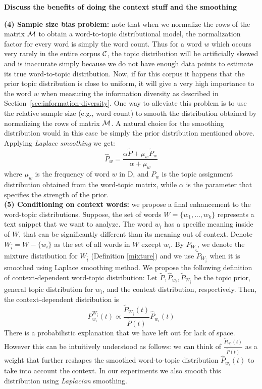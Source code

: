 {\bf Discuss the benefits of doing the context stuff and the smoothing}

{\bf (4) Sample size bias problem:}  note that 
when we normalize the rows of the matrix ${\mathcal M}$ to obtain a word-to-topic distributional model, the normalization factor 
for every word is simply the word count. Thus for a word $w$ which occurs very rarely
in the entire corpus ${\mathcal C}$, the topic distribution will be artificially skewed and is inaccurate simply because we do not have enough data points to estimate its true word-to-topic distribution.
Now, if for this corpus it happens that the prior topic distribution
is close to uniform, it will give a very high importance to the word
$w$ when measuring the information diversity as described in
Section~\ref{sec:information-diversity}.
One way to alleviate this
problem is to use the relative sample size (e.g., word count) to
smooth the distribution obtained by normalizing the rows of matrix
${\mathcal M}$. A natural choice for the smoothing distribution would in this
case be simply the prior distribution mentioned above. Applying {\em Laplace smoothing}
we get:
\begin{equation}
\widehat{P}_w=\frac{\alpha \tilde{P}+ \mu_w \tilde{P}_w}{\alpha+\mu_w}
\end{equation}
where $\mu_w$ is the frequency of word $w$ in D, and $P_w$ is the
topic assignment distribution obtained from the word-topic matrix,
while $\alpha$ is the parameter that specifies the strength of the
prior.\\
{\bf (5) Conditioning on context words:} we propose a final enhancement to the word-topic
distributions. Suppose, the set of words $W=\{w_1,...,w_k\}$
represents a text snippet that we want to analyze. The word $w_i$ has
a specific meaning inside of $W$, that can be significantly different
than its meaning out of context. Denote
$W_{\bar{i}}=W-\{w_i\}$ as the set of all words in $W$ except
$w_i$. By $P_{W_{\bar{i}}}$, we denote the mixture distribution for $W_{\bar{i}}$ (Definition \ref{mixture}) and we use $\tilde{P}_{W_{\bar{i}}}$ when it is smoothed using Laplace smoothing method. We
propose the following definition of context-dependent word-topic
distribution:
\bed
Let $\tilde{P},\widehat{P}_{w_i}, \tilde{P}_{W_{\bar{i}}}$ be the topic prior, general
topic distribution for $w_i$, and the context distribution,
respectively. Then, the context-dependent distribution is
\begin{equation*}
P^{W_{\bar{i}}}_{w_i}(t)\propto \frac{\tilde{P}_{W_{\bar{i}}}(t)}{\tilde{P}(t)}\widehat{P}_{w_i}(t)
\end{equation*}
\eed
There is a probabilistic explanation that we have left out for 
lack of space. However this can be intuitively understood as follows:
we can think of $\frac{\tilde{P}_{W_{\bar{i}}}(t)}{\tilde{P}(t)}$ as a weight
that further reshapes the smoothed word-to-topic distribution $\widehat{P}_{w_i}(t)$
to take into account the context. In our experiments we also smooth this distribution
using {\em Laplacian} smoothing.
